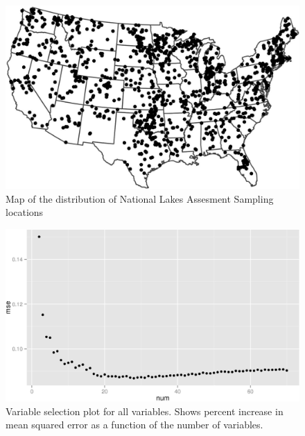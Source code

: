 \documentclass[12pt,]{article}
\begin{document}
\begin{figure}[htbp]
\centering
\includegraphics{manuscript_files/figure-latex/fig1_nlaMap-1.jpeg}
\caption{Map of the distribution of National Lakes Assesment Sampling
locations \label{fig:nlaMap}}
\end{figure}

\newpage

\begin{figure}[htbp]
\centering
\includegraphics{manuscript_files/figure-latex/all_var_sel_figure-1.jpeg}
\caption{Variable selection plot for all variables. Shows percent
increase in mean squared error as a function of the number of variables.
\label{fig:all_varsel_figure}}
\end{figure}

\newpage
\end{document}
